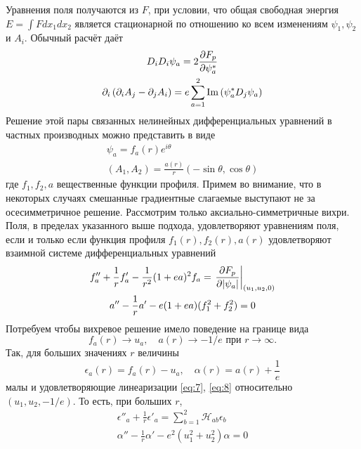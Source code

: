 Уравнения поля получаются из \( F \), при условии, что общая свободная энергия 
\( E = \int F dx_1 dx_2 \) является стационарной по отношению ко всем 
изменениям \( \psi_1, \psi_2 \) и \( A_i \). Обычный расчёт даёт 
\begin{gather}
    D_i D_i \psi_a = 2\frac{\partial F_p}{\partial \psi_a^{*}}
    \label{eq:4} \\
    \partial_i \left( \partial_i A_j - \partial_j A_i \right) = 
        e\sum\limits_{a=1}^{2}\mathrm{Im} \left( \psi_a^* D_j \psi_a \right)
    \label{eq:5}
\end{gather}
Решение этой пары связанных нелинейных дифференциальных уравнений в частных 
производных можно представить в виде
\begin{gather}
    \psi_a = f_a(r)e^{i\theta} \nonumber \\
    (A_1, A_2) = \frac{a(r)}{r}(-\sin\theta, \cos\theta)
    \label{eq:6}
\end{gather}
где \( f_1, f_2, a \) вещественные функции профиля. Примем во внимание, что 
в некоторых случаях смешанные градиентные слагаемые выступают не за 
осесимметричное решение. Рассмотрим только аксиально-симметричные вихри. 
Поля, в пределах указанного выше подхода, удовлетворяют уравнениям поля, если и 
только если функция профиля \( f_1(r), f_2(r), a(r) \) удовлетворяют взаимной 
системе дифференциальных уравнений
\begin{gather}
    f''_a + \frac{1}{r} f'_a - \frac{1}{r^2}(1+ea)^2 f_a = 
        \left. \frac{\partial F_p}{\partial |\psi_a|} \right|_{(u_1, u_2, 0)}
    \label{eq:7} \\
    a'' - \frac{1}{r} a' - e(1+ea)(f_1^2+f_2^2) = 0
    \label{eq:8}
\end{gather}
Потребуем чтобы вихревое решение имело поведение на границе вида
\[ 
    f_a(r) \rightarrow u_a, \quad a(r) \rightarrow -1/e 
    \text{ при } r \rightarrow \infty.
\]
Так, для больших значениях \( r \) величины
\begin{equation}
    \epsilon_a(r) = f_a(r) - u_a, \quad
    \alpha(r) = a(r) + \frac{1}{e}
    \label{eq:9}
\end{equation}
малы и удовлетворяющие линеаризации \eqref{eq:7}, \eqref{eq:8} относительно 
\( (u_1, u_2, -1/e) \). То есть, при больших \( r \),
\begin{gather}
    \epsilon''_a + \frac{1}{r} \epsilon'_a = \sum\limits_{b=1}^{2}
        \mathcal{H}_{ab} \epsilon_b
    \label{eq:10} \\
    \alpha'' - \frac{1}{r} \alpha' - e^2(u_1^2 + u_2^2 )\alpha = 0
    \label{eq:11}
\end{gather}
